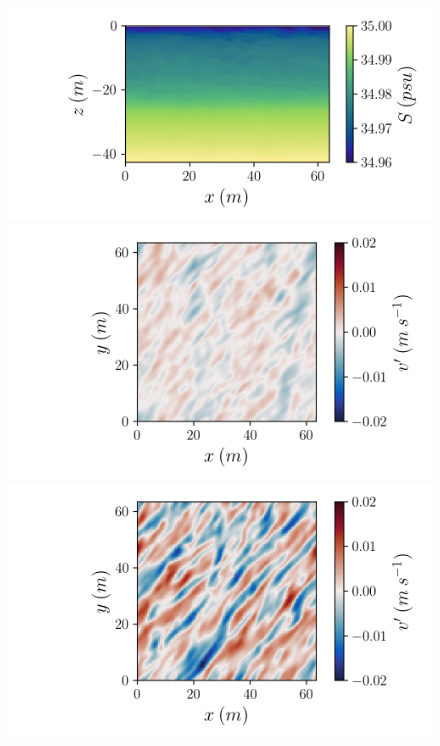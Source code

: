 \documentclass[draft]{agujournal2019}
\begin{document}
\begin{figure}[]
\begin{minipage}{0.45\textwidth}
    \end{minipage}%
    \begin{minipage}{0.55\textwidth}
        \includegraphics[trim={1.5cm 0 0.5cm 0}, clip, width=\textwidth]{Figures/sa_slope1_xz_y64_zmax42_t40.png}
    \end{minipage}
    \begin{minipage}{0.45\textwidth}
        \includegraphics[trim={1.5cm 0 3.4cm 0},clip,width=\textwidth]{Figures/v_slope01_xy_z1_zmax1_t40.png}
    \end{minipage}%
    \begin{minipage}{0.6\textwidth}
        \centering
        \includegraphics[trim={2cm 0 0.5cm 0},clip,width=\textwidth]{Figures/v_slope1_xy_z1_zmax1_t40.png}

\end{minipage}
\end{figure}
\end{document}
